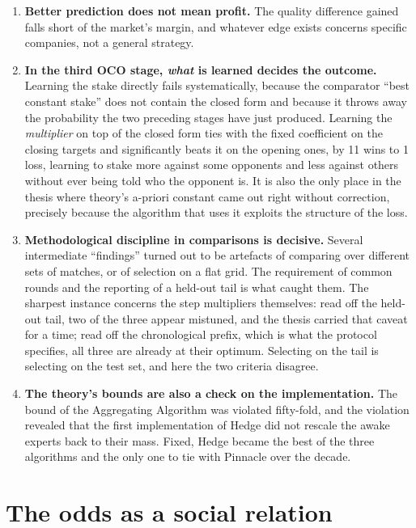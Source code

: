 \documentclass[12pt,a4paper,oneside]{report}
\renewcommand{\_}{\oldunderscore\allowbreak}
\theoremstyle{definition}
\theoremstyle{plain}
\theoremstyle{definition}   %
\begin{document}
\begin{enumerate}
  \item \textbf{Better prediction does not mean profit.} The quality difference gained falls short
        of the market's margin, and whatever edge exists concerns specific companies, not a general
        strategy.

  \item \textbf{In the third OCO stage, \emph{what} is learned decides the outcome.} Learning the
        stake directly fails systematically, because the comparator ``best constant stake'' does
        not contain the closed form and because it throws away the probability the two preceding
        stages have just produced. Learning the \emph{multiplier} on top of the closed form ties
        with the fixed coefficient on the closing targets and significantly beats it on the opening
        ones, by 11 wins to 1 loss, learning to stake more against some opponents and less
        against others without ever being told who the opponent is. It is also the only place in the thesis where
        theory's a-priori constant came out right without correction, precisely because the
        algorithm that uses it exploits the structure of the loss.

  \item \textbf{Methodological discipline in comparisons is decisive.} Several intermediate
        ``findings'' turned out to be artefacts of comparing over different sets of matches, or of
        selection on a flat grid. The requirement of common rounds and the reporting of a held-out
        tail is what caught them. The sharpest instance concerns the step multipliers themselves:
        read off the held-out tail, two of the three appear mistuned, and the thesis carried that
        caveat for a time; read off the chronological prefix, which is what the protocol specifies,
        all three are already at their optimum. Selecting on the tail is selecting on the test set,
        and here the two criteria disagree.

  \item \textbf{The theory's bounds are also a check on the implementation.} The bound of the
        Aggregating Algorithm was violated fifty-fold, and the violation revealed that the first
        implementation of Hedge did not rescale the awake experts back to their mass. Fixed,
        Hedge became the best of the three algorithms and the only one to tie with Pinnacle over
        the decade.
\end{enumerate}

\section{The odds as a social relation}
\label{sec:disc-material}
\end{document}
